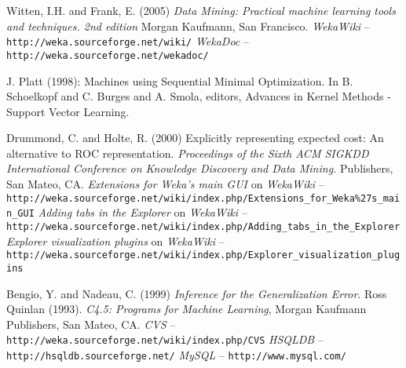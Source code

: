 
\begin{thebibliography}{999}

		Witten, I.H. and Frank, E. (2005) \textit{Data Mining: Practical machine
		learning tools and techniques. 2nd edition}  Morgan Kaufmann, San
		Francisco.
		\textit{WekaWiki} -- \texttt{http://weka.sourceforge.net/wiki/}
		\textit{WekaDoc} -- \texttt{http://weka.sourceforge.net/wekadoc/}

		J. Platt (1998): Machines using Sequential Minimal Optimization. In B. Schoelkopf and C. Burges and A. Smola, editors, Advances in Kernel Methods - Support Vector Learning.

		Drummond, C. and Holte, R. (2000) Explicitly representing expected cost: An alternative to ROC representation.
		\textit{Proceedings of the Sixth ACM SIGKDD International Conference on Knowledge Discovery and Data Mining.}
		Publishers, San Mateo, CA.
		\textit{Extensions for Weka's main GUI} on \textit{WekaWiki} -- \\
		\small{\texttt{http://weka.sourceforge.net/wiki/index.php/Extensions\_for\_Weka\%27s\_main\_GUI}}
		\textit{Adding tabs in the Explorer} on \textit{WekaWiki} -- \\
		\small{\texttt{http://weka.sourceforge.net/wiki/index.php/Adding\_tabs\_in\_the\_Explorer}}
		\textit{Explorer visualization plugins} on \textit{WekaWiki} -- \\
		\small{\texttt{http://weka.sourceforge.net/wiki/index.php/Explorer\_visualization\_plugins}}

		Bengio, Y. and Nadeau, C. (1999) \textit{Inference for the Generalization Error}.
		Ross Quinlan (1993). \textit{C4.5: Programs for Machine Learning}, Morgan Kaufmann Publishers, San Mateo, CA.
		\textit{CVS} -- \texttt{http://weka.sourceforge.net/wiki/index.php/CVS}
		\textit{HSQLDB} -- \texttt{http://hsqldb.sourceforge.net/}
		\textit{MySQL} -- \texttt{http://www.mysql.com/}


\end{thebibliography}
